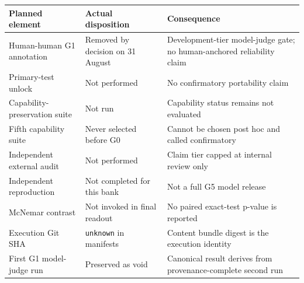 \begin{center}
\label{tab:deviations}
\scriptsize
\begin{tabularx}{\textwidth}{@{}p{}p{}X@{}}
\toprule
\textbf{Planned element} & \textbf{Actual disposition} & \textbf{Consequence} \\
\midrule
Human-human G1 annotation & Removed by decision on 31 August & Development-tier model-judge gate; no human-anchored reliability claim \\
Primary-test unlock & Not performed & No confirmatory portability claim \\
Capability-preservation suite & Not run & Capability status remains not evaluated \\
Fifth capability suite & Never selected before G0 & Cannot be chosen post hoc and called confirmatory \\
Independent external audit & Not performed & Claim tier capped at internal review only \\
Independent reproduction & Not completed for this bank & Not a full G5 model release \\
McNemar contrast & Not invoked in final readout & No paired exact-test p-value is reported \\
Execution Git SHA & \texttt{unknown} in manifests & Content bundle digest is the execution identity \\
First G1 model-judge run & Preserved as void & Canonical result derives from provenance-complete second run \\
\bottomrule
\end{tabularx}
\end{center}
